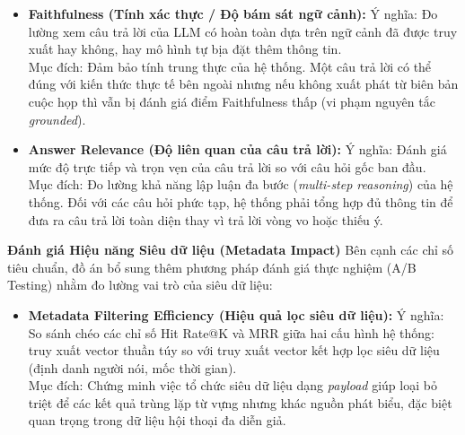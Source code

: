 \begin{itemize}[leftmargin=*, label={}]
    \item \textbf{Faithfulness (Tính xác thực / Độ bám sát ngữ cảnh):}
    Ý nghĩa: Đo lường xem câu trả lời của LLM có hoàn toàn dựa trên ngữ cảnh đã được truy xuất hay không, hay mô hình tự bịa đặt thêm thông tin. \\
    Mục đích: Đảm bảo tính trung thực của hệ thống. Một câu trả lời có thể đúng với kiến thức thực tế bên ngoài nhưng nếu không xuất phát từ biên bản cuộc họp thì vẫn bị đánh giá điểm Faithfulness thấp (vi phạm nguyên tắc \textit{grounded}).

    \item \textbf{Answer Relevance (Độ liên quan của câu trả lời):}
    Ý nghĩa: Đánh giá mức độ trực tiếp và trọn vẹn của câu trả lời so với câu hỏi gốc ban đầu. \\
    Mục đích: Đo lường khả năng lập luận đa bước (\textit{multi-step reasoning}) của hệ thống. Đối với các câu hỏi phức tạp, hệ thống phải tổng hợp đủ thông tin để đưa ra câu trả lời toàn diện thay vì trả lời vòng vo hoặc thiếu ý.
\end{itemize}

\textbf{Đánh giá Hiệu năng Siêu dữ liệu (Metadata Impact)}
Bên cạnh các chỉ số tiêu chuẩn, đồ án bổ sung thêm phương pháp đánh giá thực nghiệm (A/B Testing) nhằm đo lường vai trò của siêu dữ liệu:

\begin{itemize}[leftmargin=*, label={}]
    \item \textbf{Metadata Filtering Efficiency (Hiệu quả lọc siêu dữ liệu):}
    Ý nghĩa: So sánh chéo các chỉ số Hit Rate@K và MRR giữa hai cấu hình hệ thống: truy xuất vector thuần túy so với truy xuất vector kết hợp lọc siêu dữ liệu (định danh người nói, mốc thời gian). \\
    Mục đích: Chứng minh việc tổ chức siêu dữ liệu dạng \textit{payload} giúp loại bỏ triệt để các kết quả trùng lặp từ vựng nhưng khác nguồn phát biểu, đặc biệt quan trọng trong dữ liệu hội thoại đa diễn giả.
\end{itemize}